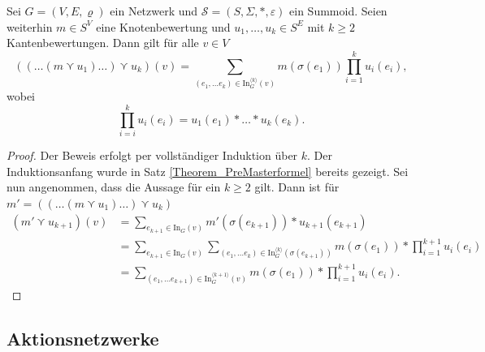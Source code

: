 \documentclass{article}
\begin{document}
\begin{theorem}\label{Theorem_Masterformel}
  Sei $G = (V, E, \varrho)$ ein Netzwerk und 
  $\mathcal{S} = (S, \Sigma, \ast, \varepsilon)$ ein Summoid.
  Seien weiterhin $m \in S^V$ eine Knotenbewertung und $u_1, \dots, u_k \in S^E$ mit $k \geq 2$ Kantenbewertungen.
  Dann gilt für alle $v \in V$
  \begin{equation*}
    ((\dots (m \curlyvee u_1) \dots) \curlyvee u_k)(v) = \sum_{(e_1, \dots e_k) \in \text{In}_G^{\langle k \rangle}(v)}m(\sigma(e_1)) \prod_{i = 1}^k u_i(e_i),
  \end{equation*}
  wobei
  \begin{equation*}
    \prod_{i = i}^k u_i(e_i) = u_1(e_1) \ast \dots \ast u_k(e_k).
  \end{equation*}
\end{theorem}
\begin{proof}
  Der Beweis erfolgt per vollständiger Induktion über $k$.
  Der Induktionsanfang wurde in Satz \ref{Theorem_PreMasterformel} bereits gezeigt.
  Sei nun angenommen, dass die Aussage für ein $k \geq 2$ gilt.
  Dann ist für $m' = ((\dots (m \curlyvee u_1) \dots) \curlyvee u_k)$
  \begin{align*}
    (m' \curlyvee u_{k + 1})(v)
    &= \sum_{e_{k+1} \in \text{In}_G(v)} m' (\sigma(e_{k+1})) \ast u_{k+1}(e_{k+1}) \\
    &= \sum_{e_{k+1} \in \text{In}_G(v)} \sum_{(e_1, \dots e_k) \in \text{In}_G^{\langle k \rangle}(\sigma(e_{k+1}))}m(\sigma(e_1)) \ast \prod_{i = 1}^{k+1} u_i(e_i) \\
    &= \sum_{(e_1, \dots e_{k+1}) \in \text{In}_G^{\langle k + 1 \rangle}(v)}m(\sigma(e_1)) \ast \prod_{i = 1}^{k+1} u_i(e_i).
  \end{align*}
\end{proof}

\subsection{Aktionsnetzwerke}
\end{document}
